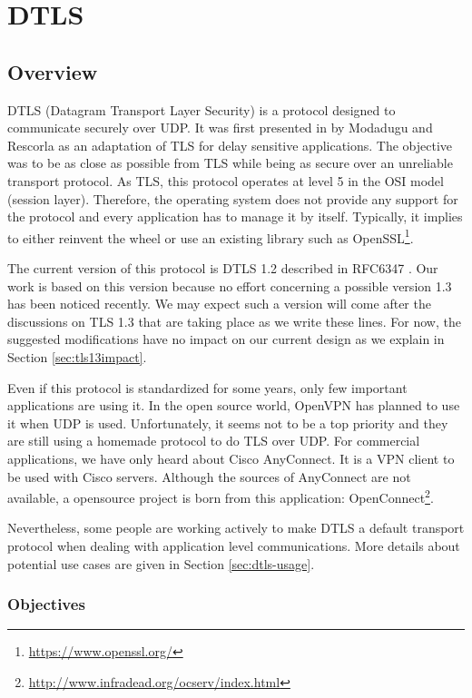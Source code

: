 \chapter{DTLS}\label{chap:dtls}


\section{Overview}

DTLS (Datagram Transport Layer Security) is a protocol designed to communicate securely over UDP. It was first presented in \cite{modadugu2004design} by Modadugu and Rescorla as an adaptation of TLS for delay sensitive applications. The objective was to be as close as possible from TLS while being as secure over an unreliable transport protocol. As TLS, this protocol operates at level 5 in the OSI model (session layer). Therefore, the operating system does not provide any support for the protocol and every application has to manage it by itself. Typically, it implies to either reinvent the wheel or use an existing library such as OpenSSL\footnote{\url{https://www.openssl.org/}}.

The current version of this protocol is DTLS 1.2 described in RFC6347 \cite{rfc6347}. Our work is based on this version because no effort concerning a possible version 1.3 has been noticed recently. We may expect such a version will come after the discussions on TLS 1.3 that are taking place as we write these lines. For now, the suggested modifications have no impact on our current design as we explain in Section \ref{sec:tls13impact}.

Even if this protocol is standardized for some years, only few important applications are using it. In the open source world, OpenVPN has planned to use it when UDP is used. Unfortunately, it seems not to be a top priority and they are still using a homemade protocol to do TLS over UDP. For commercial applications, we have only heard about Cisco AnyConnect. It is a VPN client to be used with Cisco servers. Although the sources of AnyConnect are not available, a opensource project is born from this application: OpenConnect\footnote{\url{http://www.infradead.org/ocserv/index.html}}.

Nevertheless, some people are working actively to make DTLS a default transport protocol when dealing with application level communications. More details about potential use cases are given in Section \ref{sec:dtls-usage}.

\subsection{Objectives}

